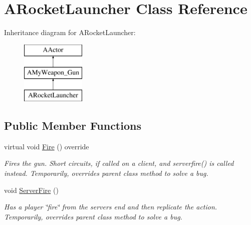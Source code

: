 \hypertarget{class_a_rocket_launcher}{}\section{A\+Rocket\+Launcher Class Reference}
\label{class_a_rocket_launcher}
Inheritance diagram for A\+Rocket\+Launcher\+:\begin{figure}[H]
\begin{center}
\leavevmode
\includegraphics[height=3.000000cm]{class_a_rocket_launcher}
\end{center}
\end{figure}
\subsection*{Public Member Functions}
\begin{DoxyCompactItemize}
\item 
\mbox{\label{class_a_rocket_launcher_a32f4db5a70f3a9e6b8cf0d8c0e84f78b}} 
virtual void \mbox{\hyperlink{class_a_rocket_launcher_a32f4db5a70f3a9e6b8cf0d8c0e84f78b}{Fire}} () override
\begin{DoxyCompactList}\small\item\em Fires the gun. Short circuits, if called on a client, and serverfire() is called instead. Temporarily, overrides parent class method to solve a bug. \end{DoxyCompactList}\item 
\mbox{\label{class_a_rocket_launcher_af09c3d3fd27a768ddafde48045b3e4e5}} 
void \mbox{\hyperlink{class_a_rocket_launcher_af09c3d3fd27a768ddafde48045b3e4e5}{Server\+Fire}} ()
\begin{DoxyCompactList}\small\item\em Has a player \char`\"{}fire\char`\"{} from the server\textquotesingle{}s end and then replicate the action. Temporarily, overrides parent class method to solve a bug. \end{DoxyCompactList}\end{DoxyCompactItemize}
